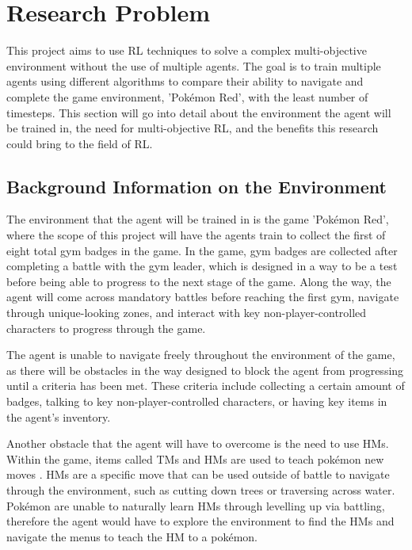 \section{Research Problem}

This project aims to use RL techniques to solve a complex multi-objective environment without the use of multiple agents. The goal is to train multiple agents using different algorithms to compare their ability to navigate and complete the game environment, 'Pokémon Red', with the least number of timesteps. This section will go into detail about the environment the agent will be trained in, the need for multi-objective RL, and the benefits this research could bring to the field of RL.

\subsection{Background Information on the Environment}

The environment that the agent will be trained in is the game 'Pokémon Red', where the scope of this project will have the agents train to collect the first of eight total gym badges in the game. In the game, gym badges are collected after completing a battle with the gym leader, which is designed in a way to be a test before being able to progress to the next stage of the game. Along the way, the agent will come across mandatory battles before reaching the first gym, navigate through unique-looking zones, and interact with key non-player-controlled characters to progress through the game. 

The agent is unable to navigate freely throughout the environment of the game, as there will be obstacles in the way designed to block the agent from progressing until a criteria has been met. These criteria include collecting a certain amount of badges, talking to key non-player-controlled characters, or having key items in the agent's inventory.  

Another obstacle that the agent will have to overcome is the need to use HMs. Within the game, items called TMs and HMs are used to teach pokémon new moves \cite{SerebiiTeam2016}. HMs are a specific move that can be used outside of battle to navigate through the environment, such as cutting down trees or traversing across water. Pokémon are unable to naturally learn HMs through levelling up via battling, therefore the agent would have to explore the environment to find the HMs and navigate the menus to teach the HM to a pokémon.

